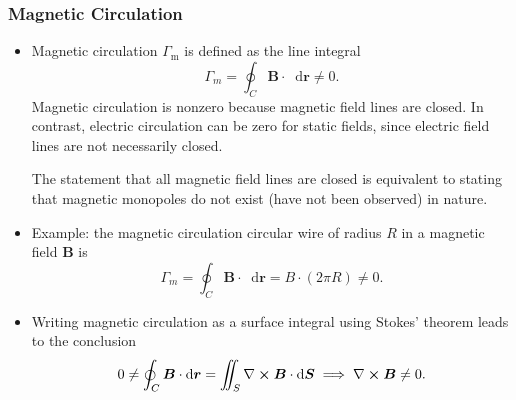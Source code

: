 \documentclass[11pt, a4paper]{article}
\newcommand{\diff}{\mathop{}\!\mathrm{d}} %
\renewcommand{\vec}[1]{\bm{#1}} %
\renewcommand{\r}{\vec{r}}
\newcommand{\B}{\vec{B}} %
\renewcommand{\curl}{\nabla \cross}
\begin{document}
\subsubsection{Magnetic Circulation}
\begin{itemize}
	\item Magnetic circulation $ \Gamma_{\text{m}} $ is defined as the line integral
	\begin{equation*}
		\Gamma_{m} = \oint_{C}\B \cdot \diff \r \neq 0.
	\end{equation*}
	Magnetic circulation is nonzero because magnetic field lines are closed. In contrast, electric circulation can be zero for static fields, since electric field lines are not necessarily closed.
	
	The statement that all magnetic field lines are closed is equivalent to stating that magnetic monopoles do not exist (have not been observed) in nature.
	
	\item Example: the magnetic circulation circular wire of radius $ R $ in a magnetic field $ \B $ is
	\begin{equation*}
		\Gamma_{m} = \oint_{C}\B \cdot \diff \r = B \cdot (2\pi R) \neq 0.
	\end{equation*}
	
	\item Writing magnetic circulation as a surface integral using Stokes' theorem leads to the conclusion
	\begin{equation*}
		0 \neq \oint_{C}\B \cdot \diff \r = \iint_{S} \curl \B \cdot \diff \vec{S} \implies \curl \B \neq 0.
	\end{equation*}
	
\end{itemize}
\end{document}

